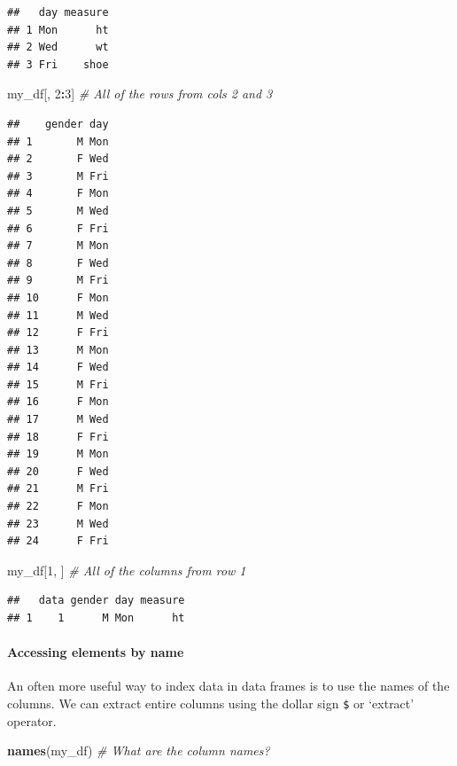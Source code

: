\documentclass[]{article}
\newenvironment{Shaded}{\begin{snugshade}}{\end{snugshade}}
\newcommand{\KeywordTok}[1]{\textcolor[rgb]{0.13,0.29,0.53}{\textbf{#1}}}
\newcommand{\DecValTok}[1]{\textcolor[rgb]{0.00,0.00,0.81}{#1}}
\newcommand{\CommentTok}[1]{\textcolor[rgb]{0.56,0.35,0.01}{\textit{#1}}}
\newcommand{\OperatorTok}[1]{\textcolor[rgb]{0.81,0.36,0.00}{\textbf{#1}}}
\newcommand{\NormalTok}[1]{#1}
\let\oldparagraph\paragraph
\renewcommand{\paragraph}[1]{\oldparagraph{#1}\mbox{}}
\begin{document}
\begin{verbatim}
##   day measure
## 1 Mon      ht
## 2 Wed      wt
## 3 Fri    shoe
\end{verbatim}

\begin{Shaded}
\begin{Highlighting}[]
\NormalTok{my_df[, }\DecValTok{2}\OperatorTok{:}\DecValTok{3}\NormalTok{]  }\CommentTok{# All of the rows from cols 2 and 3}
\end{Highlighting}
\end{Shaded}

\begin{verbatim}
##    gender day
## 1       M Mon
## 2       F Wed
## 3       M Fri
## 4       F Mon
## 5       M Wed
## 6       F Fri
## 7       M Mon
## 8       F Wed
## 9       M Fri
## 10      F Mon
## 11      M Wed
## 12      F Fri
## 13      M Mon
## 14      F Wed
## 15      M Fri
## 16      F Mon
## 17      M Wed
## 18      F Fri
## 19      M Mon
## 20      F Wed
## 21      M Fri
## 22      F Mon
## 23      M Wed
## 24      F Fri
\end{verbatim}

\begin{Shaded}
\begin{Highlighting}[]
\NormalTok{my_df[}\DecValTok{1}\NormalTok{, ]  }\CommentTok{# All of the columns from row 1}
\end{Highlighting}
\end{Shaded}

\begin{verbatim}
##   data gender day measure
## 1    1      M Mon      ht
\end{verbatim}

\paragraph{Accessing elements by name}\label{accessing-elements-by-name}

An often more useful way to index data in data frames is to use the
names of the columns. We can extract entire columns using the dollar
sign \texttt{\$} or `extract' operator.

\begin{Shaded}
\begin{Highlighting}[]
\KeywordTok{names}\NormalTok{(my_df)  }\CommentTok{# What are the column names?}
\end{Highlighting}
\end{Shaded}
\end{document}
